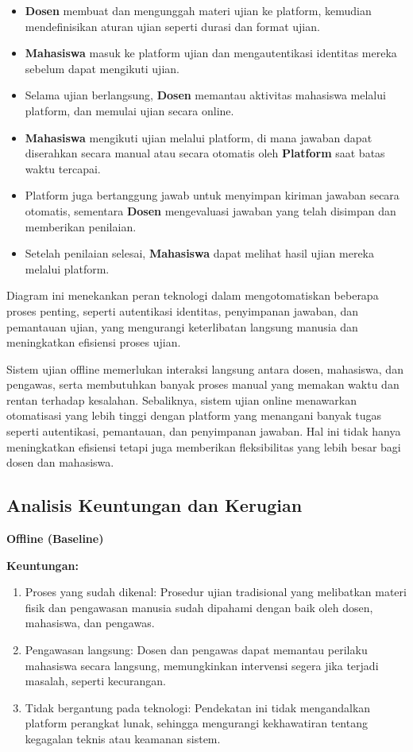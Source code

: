 \begin{itemize}
	\item \textbf{Dosen} membuat dan mengunggah materi ujian ke platform, kemudian mendefinisikan aturan ujian seperti durasi dan format ujian.
	\item \textbf{Mahasiswa} masuk ke platform ujian dan mengautentikasi identitas mereka sebelum dapat mengikuti ujian.
	\item Selama ujian berlangsung, \textbf{Dosen} memantau aktivitas mahasiswa melalui platform, dan memulai ujian secara online.
	\item \textbf{Mahasiswa} mengikuti ujian melalui platform, di mana jawaban dapat diserahkan secara manual atau secara otomatis oleh \textbf{Platform} saat batas waktu tercapai.
	\item Platform juga bertanggung jawab untuk menyimpan kiriman jawaban secara otomatis, sementara \textbf{Dosen} mengevaluasi jawaban yang telah disimpan dan memberikan penilaian.
	\item Setelah penilaian selesai, \textbf{Mahasiswa} dapat melihat hasil ujian mereka melalui platform.
\end{itemize}

Diagram ini menekankan peran teknologi dalam mengotomatiskan beberapa proses penting, seperti autentikasi identitas, penyimpanan jawaban, dan pemantauan ujian, yang mengurangi keterlibatan langsung manusia dan meningkatkan efisiensi proses ujian.

Sistem ujian offline memerlukan interaksi langsung antara dosen, mahasiswa, dan pengawas, serta membutuhkan banyak proses manual yang memakan waktu dan rentan terhadap kesalahan. Sebaliknya, sistem ujian online menawarkan otomatisasi yang lebih tinggi dengan platform yang menangani banyak tugas seperti autentikasi, pemantauan, dan penyimpanan jawaban. Hal ini tidak hanya meningkatkan efisiensi tetapi juga memberikan fleksibilitas yang lebih besar bagi dosen dan mahasiswa.


\subsection{Analisis Keuntungan dan Kerugian}

\textbf{Offline (Baseline)}

\textbf{Keuntungan:}
\begin{enumerate}
	\item Proses yang sudah dikenal: Prosedur ujian tradisional yang melibatkan materi fisik dan pengawasan manusia sudah dipahami dengan baik oleh dosen, mahasiswa, dan pengawas.
	\item Pengawasan langsung: Dosen dan pengawas dapat memantau perilaku mahasiswa secara langsung, memungkinkan intervensi segera jika terjadi masalah, seperti kecurangan.
	\item Tidak bergantung pada teknologi: Pendekatan ini tidak mengandalkan platform perangkat lunak, sehingga mengurangi kekhawatiran tentang kegagalan teknis atau keamanan sistem.
\end{enumerate}

